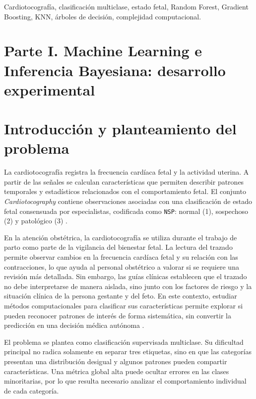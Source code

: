 \begin{IEEEkeywords}
Cardiotocograf\'ia, clasificaci\'on multiclase, estado fetal, Random Forest, Gradient Boosting, KNN, \'arboles de decisi\'on, complejidad computacional.
\end{IEEEkeywords}

\section*{Parte I. Machine Learning e Inferencia Bayesiana: desarrollo experimental}
\section{Introducci\'on y planteamiento del problema}
La cardiotocograf\'ia registra la frecuencia card\'iaca fetal y la actividad uterina. A partir de las se\~nales se calculan caracter\'isticas que permiten describir patrones temporales y estad\'isticos relacionados con el comportamiento fetal. El conjunto \textit{Cardiotocography} contiene observaciones asociadas con una clasificaci\'on de estado fetal consensuada por especialistas, codificada como \texttt{NSP}: normal (1), sospechoso (2) y patol\'ogico (3) \parencite{uci_ctg, ayres2000sisporto}.

En la atenci\'on obst\'etrica, la cardiotocograf\'ia se utiliza durante el trabajo de parto como parte de la vigilancia del bienestar fetal. La lectura del trazado permite observar cambios en la frecuencia card\'iaca fetal y su relaci\'on con las contracciones, lo que ayuda al personal obst\'etrico a valorar si se requiere una revisi\'on m\'as detallada. Sin embargo, las gu\'ias cl\'inicas establecen que el trazado no debe interpretarse de manera aislada, sino junto con los factores de riesgo y la situaci\'on cl\'inica de la persona gestante y del feto. En este contexto, estudiar m\'etodos computacionales para clasificar sus caracter\'isticas permite explorar si pueden reconocer patrones de inter\'es de forma sistem\'atica, sin convertir la predicci\'on en una decisi\'on m\'edica aut\'onoma \parencite{nice_ng229}.

El problema se plantea como clasificaci\'on supervisada multiclase. Su dificultad principal no radica solamente en separar tres etiquetas, sino en que las categor\'ias presentan una distribuci\'on desigual y algunos patrones pueden compartir caracter\'isticas. Una m\'etrica global alta puede ocultar errores en las clases minoritarias, por lo que resulta necesario analizar el comportamiento individual de cada categor\'ia.

